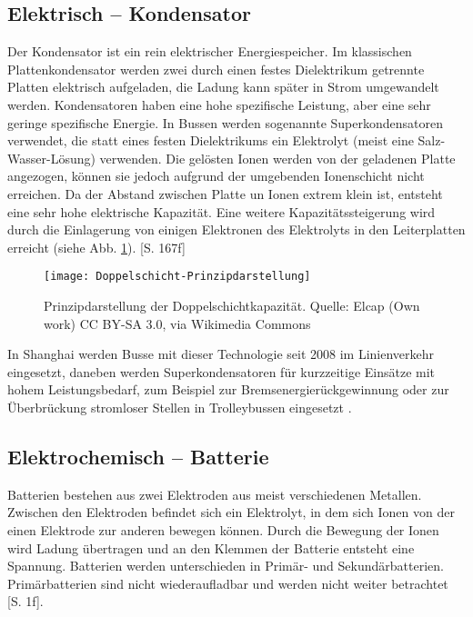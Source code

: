 \subsection{Elektrisch – Kondensator} %
Der Kondensator ist ein rein elektrischer Energiespeicher. Im klassischen Plattenkondensator werden zwei durch einen festes Dielektrikum getrennte Platten elektrisch aufgeladen, die Ladung kann später in Strom umgewandelt werden. Kondensatoren haben eine hohe spezifische Leistung, aber eine sehr geringe spezifische Energie. In Bussen werden sogenannte Superkondensatoren verwendet, die statt eines festen Dielektrikums ein Elektrolyt (meist eine Salz-Wasser-Lösung) verwenden. Die gelösten Ionen werden von der geladenen Platte angezogen, können sie jedoch aufgrund der umgebenden Ionenschicht nicht erreichen. Da der Abstand zwischen Platte un Ionen extrem klein ist, entsteht eine sehr hohe elektrische Kapazität. Eine weitere Kapazitätssteigerung wird durch die Einlagerung von einigen Elektronen des Elektrolyts in den Leiterplatten erreicht (siehe Abb. \ref{abb_doppelschicht}). \cite{Sterner:2014}[S. 167f]\\
\begin{figure}\centering
	 \texttt{[image: Doppelschicht-Prinzipdarstellung]}
	 \caption{Prinzipdarstellung der Doppelschichtkapazität. Quelle: Elcap (Own work) CC BY-SA 3.0, via Wikimedia Commons}
	 \label{abb_doppelschicht}
\end{figure}
In Shanghai werden Busse mit dieser Technologie seit 2008 im Linienverkehr eingesetzt, daneben werden Superkondensatoren für kurzzeitige Einsätze mit hohem Leistungsbedarf, zum Beispiel zur Bremsenergierückgewinnung oder zur Überbrückung stromloser Stellen in Trolleybussen eingesetzt \cite{Barminer-Busgesellschaft:2012}.
\subsection{Elektrochemisch – Batterie} %
Batterien bestehen aus zwei Elektroden aus meist verschiedenen Metallen. Zwischen den Elektroden befindet sich ein Elektrolyt, in dem sich Ionen von der einen Elektrode zur anderen bewegen können. Durch die Bewegung der Ionen wird Ladung übertragen und an den Klemmen der Batterie entsteht eine Spannung. Batterien werden unterschieden in Primär- und Sekundärbatterien. Primärbatterien sind nicht wiederaufladbar und werden nicht weiter betrachtet \cite{KiehneBattery}[S. 1f].
